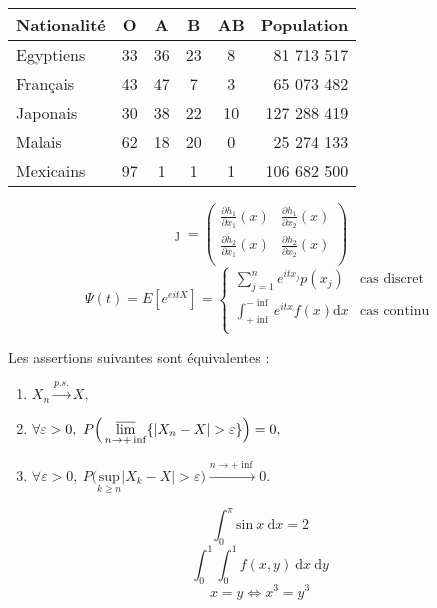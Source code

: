 \documentclass[12pt]{report}
\begin{document}
	\begin{tabular}{|l||c|c|c|c||r|}
		\hline
		Nationalité & O & A & B & AB & Population \\
		\hline\hline
		Egyptiens & 33 & 36 & 23 & 8 & 81 713 517 \\
		Français & 43 & 47 & 7 & 3 & 65 073 482 \\
		Japonais & 30 & 38 & 22 & 10 & 127 288 419 \\
		Malais & 62 & 18 & 20 & 0 & 25 274 133 \\
		Mexicains & 97 & 1 & 1 & 1 & 106 682 500 \\
		\hline
	\end{tabular}
	\begin{equation*}
		\jmath =
		\begin{pmatrix}
			\frac{\partial h_1}{\partial x_1}(x) &
			\frac{\partial h_1}{\partial x_2}(x) \\[3mm]
			\frac{\partial h_2}{\partial x_1}(x) &
			\frac{\partial h_2}{\partial x_2}(x) \\
		\end{pmatrix}	
	\end{equation*}
	\begin{equation*}
		\Psi (t) = E[e^{eitX}] = 
		\begin{cases}
			\displaystyle\sum_{j=1}^{n} e^{itx_j}p(x_j) & \text{cas discret} \\
			\displaystyle\int_{+\inf}^{-\inf} e^{itx} f(x)\text{d}x&
			\text{cas continu} \\
		\end{cases}
	\end{equation*}
	
	\noindent Les assertions suivantes sont équivalentes :
	\begin{enumerate}[(1)]
		\item $X_n \overset{p.s.}\longrightarrow X,$
		\item $\forall \varepsilon > 0,\ P \Big(\varlimsup\limits_{n\rightarrow +\inf} \{|X_n - X| > \varepsilon\} \Big) = 0,$
		\item $\forall \varepsilon > 0,\ P \Big(\underset{k \geqslant n}{\text{sup}} |X_k - X| > \varepsilon\Big) \xrightarrow{n\rightarrow +\inf} 0.$
	\end{enumerate}
	\begin{equation*}
		\displaystyle\int_{0}^{\pi} \text{sin}\ x\ \text{d}x = 2
	\end{equation*}
	\begin{equation*}
		\int_{0}^{1}\int_{0}^{1} f(x,y)\ \text{d}x\ \text{d}y
	\end{equation*}
	\begin{equation*}
		x = y \Leftrightarrow x^3 = y^3
	\end{equation*}
	
\end{document}
